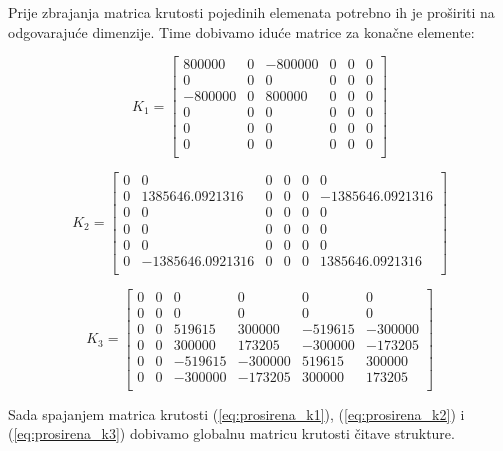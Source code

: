 \documentclass[a4paper,twoside,12pt]{memoir} %
\begin{document}
Prije zbrajanja matrica krutosti pojedinih elemenata potrebno ih je proširiti na odgovarajuće dimenzije. Time dobivamo iduće matrice za konačne elemente:

\begin{equation}
\label{eq:prosirena_k1}
    K_1 =
    \begin{bmatrix}
    800000 & 0 & -800000 & 0 & 0 & 0 \\
    0 & 0 & 0 & 0 & 0 & 0 \\
    -800000 & 0 & 800000 & 0 & 0 & 0 \\
    0 & 0 & 0 & 0 & 0 & 0 \\
    0 & 0 & 0 & 0 & 0 & 0 \\
    0 & 0 & 0 & 0 & 0 & 0 \\
    \end{bmatrix}
\end{equation}

\begin{equation}
\label{eq:prosirena_k2}
    K_2 =
    \begin{bmatrix}
    0 & 0 & 0 & 0 & 0 & 0 \\
    0 & 1385646.0921316 & 0 & 0 & 0 & -1385646.0921316 \\
    0 & 0 & 0 & 0 & 0 & 0 \\
    0 & 0 & 0 & 0 & 0 & 0 \\
    0 & 0 & 0 & 0 & 0 & 0 \\
    0 & -1385646.0921316 & 0 & 0 & 0 & 1385646.0921316 \\
    \end{bmatrix}
\end{equation}

\begin{equation}
\label{eq:prosirena_k3}
    K_3 =
    \begin{bmatrix}
    0 & 0 & 0 & 0 & 0 & 0 \\
    0 & 0 & 0 & 0 & 0 & 0 \\
    0 & 0 & 519615 & 300000 & -519615 & -300000 \\
    0 & 0 & 300000 & 173205 & -300000 & -173205 \\
    0 & 0 & -519615 & -300000 & 519615 & 300000 \\
    0 & 0 & -300000 & -173205 & 300000 & 173205 \\
    \end{bmatrix}
\end{equation}

Sada spajanjem matrica krutosti (\ref{eq:prosirena_k1}), (\ref{eq:prosirena_k2}) i (\ref{eq:prosirena_k3}) dobivamo globalnu matricu krutosti čitave strukture.
\end{document}
